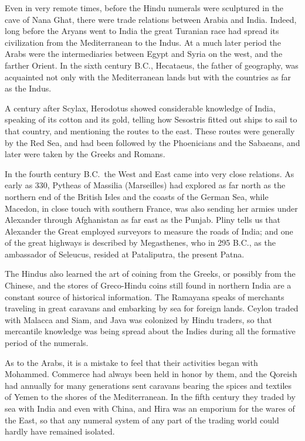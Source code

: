 \documentclass[11pt,a4paper]{article}
\begin{document}
Even in very remote times, before the Hindu numerals were sculptured in the cave of Nana Ghat, there were trade relations between Arabia and India. Indeed, long before the Aryans went to India the great Turanian race had spread its civilization from the Mediterranean to the Indus. At a much later period the Arabs were the intermediaries between Egypt and Syria on the west, and the farther Orient. In the sixth century B.C., Hecataeus, the father of geography, was acquainted not only with the Mediterranean lands but with the countries as far as the Indus.

A century after Scylax, Herodotus showed considerable knowledge of India, speaking of its cotton and its gold, telling how Sesostris fitted out ships to sail to that country, and mentioning the routes to the east. These routes were generally by the Red Sea, and had been followed by the Phoenicians and the Sabaeans, and later were taken by the Greeks and Romans.

In the fourth century B.C.\ the West and East came into very close relations. As early as 330, Pytheas of Massilia (Marseilles) had explored as far north as the northern end of the British Isles and the coasts of the German Sea, while Macedon, in close touch with southern France, was also sending her armies under Alexander through Afghanistan as far east as the Punjab. Pliny tells us that Alexander the Great employed surveyors to measure the roads of India; and one of the great highways is described by Megasthenes, who in 295 B.C., as the ambassador of Seleucus, resided at Pataliputra, the present Patna.

The Hindus also learned the art of coining from the Greeks, or possibly from the Chinese, and the stores of Greco-Hindu coins still found in northern India are a constant source of historical information. The Ramayana speaks of merchants traveling in great caravans and embarking by sea for foreign lands. Ceylon traded with Malacca and Siam, and Java was colonized by Hindu traders, so that mercantile knowledge was being spread about the Indies during all the formative period of the numerals.

As to the Arabs, it is a mistake to feel that their activities began with Mohammed. Commerce had always been held in honor by them, and the Qoreish had annually for many generations sent caravans bearing the spices and textiles of Yemen to the shores of the Mediterranean. In the fifth century they traded by sea with India and even with China, and Hira was an emporium for the wares of the East, so that any numeral system of any part of the trading world could hardly have remained isolated.
\end{document}
